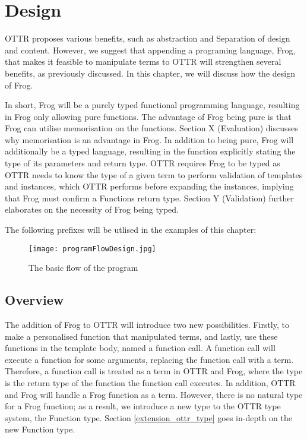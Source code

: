 
\chapter{Design} %
OTTR proposes various benefits, such as abstraction and Separation of design and content. However, we suggest that appending a programing language, Frog, that makes it feasible to manipulate terms to OTTR will strengthen several benefits, as previously discussed.  In this chapter, we will discuss how the design of Frog.

\para 
In short, Frog will be a purely typed functional programming language, resulting in Frog only allowing pure functions. The advantage of Frog being pure is that Frog can utilise memorisation on the functions. Section X (Evaluation) discusses why memorisation is an advantage in Frog. In addition to being pure, Frog will additionally be a typed language, resulting in the function explicitly stating the type of its parameters and return type. OTTR requires Frog to be typed as OTTR needs to know the type of a given term to perform validation of templates and instances, which OTTR performs before expanding the instances, implying that Frog must confirm a Functions return type. Section Y (Validation) further elaborates on the necessity of Frog being typed. 

\para
The following prefixes will be utlised in the examples of this chapter:



\begin{figure}[h]
    \centering
    \texttt{[image: programFlowDesign.jpg]}
    \caption{The basic flow of the program}
    \label{fig:basic_program_flow}
\end{figure}

\section{Overview}
The addition of Frog to OTTR will introduce two new possibilities. Firstly, to make a personalised function that manipulated terms, and lastly, use these functions in the template body, named a function call. A function call will execute a function for some arguments, replacing the function call with a term. Therefore, a function call is treated as a term in OTTR and Frog, where the type is the return type of the function the function call executes. In addition, OTTR and Frog will handle a Frog function as a term. However, there is no natural type for a Frog function; as a result, we introduce a new type to the OTTR type system, the Function type. Section \ref{extension_ottr_type} goes in-depth on the new Function type. 

